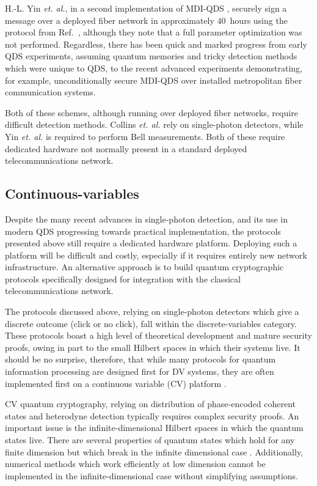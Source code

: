 H.-L. Yin \emph{et. al.}, in a second implementation of MDI-QDS \cite{Yin2017}, securely sign a message over a deployed fiber network in approximately $40$~hours using the protocol from Ref.~\cite{Puthoor2016}, although they note that a full parameter optimization was not performed. Regardless, there has been quick and marked progress from early QDS experiments, assuming quantum memories and tricky detection methods which were unique to QDS, to the recent advanced experiments demonstrating, for example, unconditionally secure MDI-QDS over installed metropolitan fiber communication systems.

Both of these schemes, although running over deployed fiber networks, require difficult detection methods. Collins \emph{et. al.} \cite{Collins2016} rely on single-photon detectors, while Yin \emph{et. al.} \cite{Yin2017} is required to perform Bell measurements. Both of these require dedicated hardware not normally present in a standard deployed telecommunications network.


\subsection{Continuous-variables}


Despite the many recent advances in single-photon detection, and its use in modern QDS progressing towards practical implementation, the protocols presented above still require a dedicated hardware platform. Deploying such a platform will be difficult and costly, especially if it requires entirely new network infrastructure. An alternative approach is to build quantum cryptographic protocols specifically designed for integration with the classical telecommunications network. 

The protocols discussed above, relying on single-photon detectors which give a discrete outcome (click or no click), fall within the discrete-variables category. These protocols boast a high level of theoretical development and mature security proofs, owing in part to the small Hilbert spaces in which their systems live. It should be no surprise, therefore, that while many protocols for quantum information processing are designed first for DV systems, they are often implemented first on a continuous variable (CV) platform \cite{Braunstein1998}.

CV quantum cryptography, relying on distribution of phase-encoded coherent states and heterodyne detection typically requires complex security proofs. An important issue is the infinite-dimensional Hilbert spaces in which the quantum states live. There are several properties of quantum states which hold for any finite dimension but which break in the infinite dimensional case \cite{Ranade2015}.  Additionally, numerical methods which work efficiently at low dimension \cite{Coles2016} cannot be implemented in the infinite-dimensional case without simplifying assumptions.

